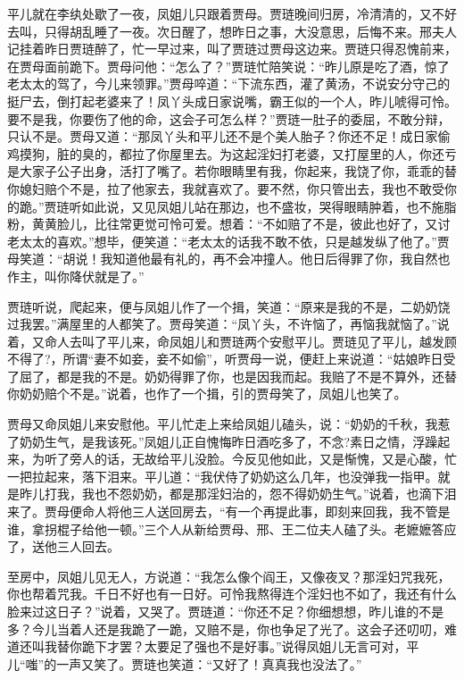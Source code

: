 \documentclass[12pt,oneside]{book}
\begin{document}
平儿就在李纨处歇了一夜，凤姐儿只跟着贾母。贾琏晚间归房，冷清清的，又不好去叫，只得胡乱睡了一夜。次日醒了，想昨日之事，大没意思，后悔不来。邢夫人记挂着昨日贾琏醉了，忙一早过来，叫了贾琏过贾母这边来。贾琏只得忍愧前来，在贾母面前跪下。贾母问他：“怎么了？”贾琏忙陪笑说：“昨儿原是吃了酒，惊了老太太的驾了，今儿来领罪。”贾母啐道：“下流东西，灌了黄汤，不说安分守己的挺尸去，倒打起老婆来了！凤丫头成日家说嘴，霸王似的一个人，昨儿唬得可怜。要不是我，你要伤了他的命，这会子可怎么样？”贾琏一肚子的委屈，不敢分辩，只认不是。贾母又道：“那凤丫头和平儿还不是个美人胎子？你还不足！成日家偷鸡摸狗，脏的臭的，都拉了你屋里去。为这起淫妇打老婆，又打屋里的人，你还亏是大家子公子出身，活打了嘴了。若你眼睛里有我，你起来，我饶了你，乖乖的替你媳妇赔个不是，拉了他家去，我就喜欢了。要不然，你只管出去，我也不敢受你的跪。”贾琏听如此说，又见凤姐儿站在那边，也不盛妆，哭得眼睛肿着，也不施脂粉，黄黄脸儿，比往常更觉可怜可爱。想着：“不如赔了不是，彼此也好了，又讨老太太的喜欢。”想毕，便笑道：“老太太的话我不敢不依，只是越发纵了他了。”贾母笑道：“胡说！我知道他最有礼的，再不会冲撞人。他日后得罪了你，我自然也作主，叫你降伏就是了。”

贾琏听说，爬起来，便与凤姐儿作了一个揖，笑道：“原来是我的不是，二奶奶饶过我罢。”满屋里的人都笑了。贾母笑道：“凤丫头，不许恼了，再恼我就恼了。”说着，又命人去叫了平儿来，命凤姐儿和贾琏两个安慰平儿。贾琏见了平儿，越发顾不得了?，所谓“妻不如妾，妾不如偷”，听贾母一说，便赶上来说道：“姑娘昨日受了屈了，都是我的不是。奶奶得罪了你，也是因我而起。我赔了不是不算外，还替你奶奶赔个不是。”说着，也作了一个揖，引的贾母笑了，凤姐儿也笑了。

贾母又命凤姐儿来安慰他。平儿忙走上来给凤姐儿磕头，说：“奶奶的千秋，我惹了奶奶生气，是我该死。”凤姐儿正自愧悔昨日酒吃多了，不念?素日之情，浮躁起来，为听了旁人的话，无故给平儿没脸。今反见他如此，又是惭愧，又是心酸，忙一把拉起来，落下泪来。平儿道：“我伏侍了奶奶这么几年，也没弹我一指甲。就是昨儿打我，我也不怨奶奶，都是那淫妇治的，怨不得奶奶生气。”说着，也滴下泪来了。贾母便命人将他三人送回房去，“有一个再提此事，即刻来回我，我不管是谁，拿拐棍子给他一顿。”三个人从新给贾母、邢、王二位夫人磕了头。老嬷嬷答应了，送他三人回去。

至房中，凤姐儿见无人，方说道：“我怎么像个阎王，又像夜叉？那淫妇咒我死，你也帮着咒我。千日不好也有一日好。可怜我熬得连个淫妇也不如了，我还有什么脸来过这日子？”说着，又哭了。贾琏道：“你还不足？你细想想，昨儿谁的不是多？今儿当着人还是我跪了一跪，又赔不是，你也争足了光了。这会子还叨叨，难道还叫我替你跪下才罢？太要足了强也不是好事。”说得凤姐儿无言可对，平儿“嗤”的一声又笑了。贾琏也笑道：“又好了！真真我也没法了。”
\end{document}
